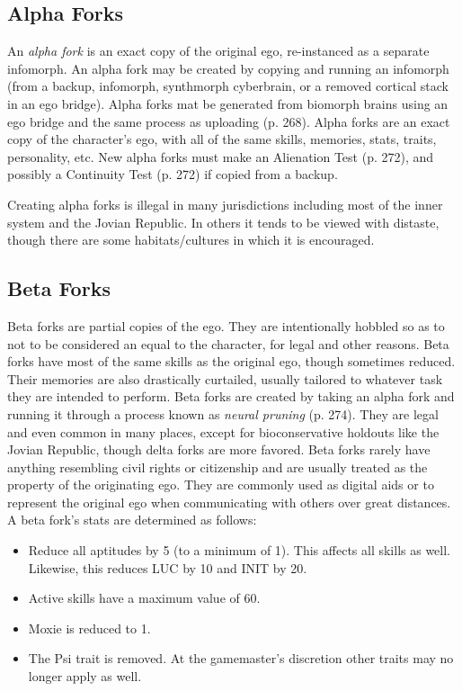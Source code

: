 \subsection{Alpha Forks} 

An \textit{alpha fork} is an exact copy of the original ego, re-instanced as a separate infomorph. An alpha fork may be created by copying and running an infomorph (from a backup, infomorph, synthmorph cyberbrain, or a removed cortical stack in an ego bridge). Alpha forks mat be generated from biomorph brains using an ego bridge and the same process as uploading (p. 268). Alpha forks are an exact copy of the character's ego, with all of the same skills, memories, stats, traits, personality, etc. New alpha forks must make an Alienation Test (p. 272), and possibly a Continuity Test (p. 272) if copied from a backup. 

Creating alpha forks is illegal in many jurisdictions including most of the inner system and the Jovian Republic. In others it tends to be viewed with distaste, though there are some habitats/cultures in which it is encouraged. 

\subsection{Beta Forks} 

Beta forks are partial copies of the ego. They are intentionally hobbled so as to not to be considered an equal to the character, for legal and other reasons. Beta forks have most of the same skills as the original ego, though sometimes reduced. Their memories are also drastically curtailed, usually tailored to whatever task they are intended to perform. Beta forks are created by taking an alpha fork and running it through a process known as \textit{neural pruning} (p. 274). They are legal and even common in many places, except for bioconservative holdouts like the Jovian Republic, though delta forks are more favored. Beta forks rarely have anything resembling civil rights or citizenship and are usually treated as the property of the originating ego. They are commonly used as digital aids or to represent the original ego when communicating with others over great distances. \\ A beta fork's stats are determined as follows: 

\begin{itemize} \item Reduce all aptitudes by 5 (to a minimum of 1). This affects all skills as well. Likewise, this reduces LUC by 10 and INIT by 20. \item Active skills have a maximum value of 60. \item Moxie is reduced to 1. \item The Psi trait is removed. At the gamemaster's discretion other traits may no longer apply as well. \end{itemize} 

